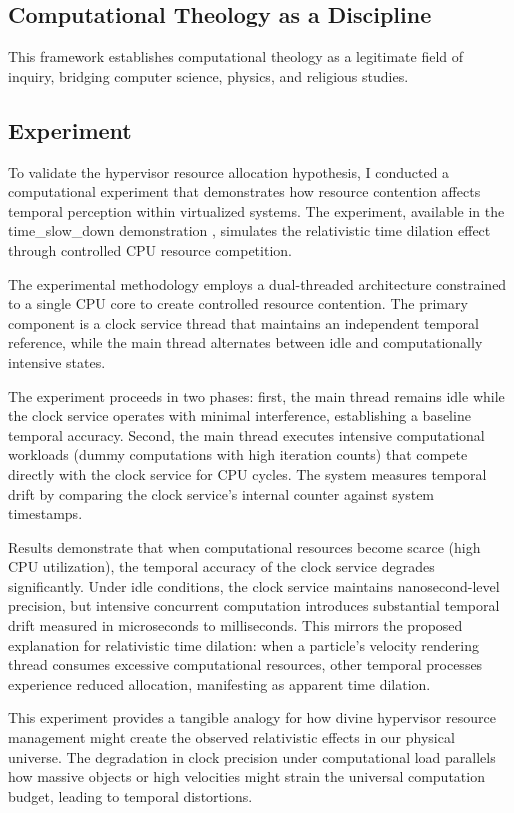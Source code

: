 \documentclass[12pt,a4paper]{article}
\begin{document}
\subsection{Computational Theology as a Discipline}

This framework establishes computational theology as a legitimate field of inquiry, bridging computer science, physics, and religious studies.

\subsection{Experiment}

To validate the hypervisor resource allocation hypothesis, I conducted a computational experiment that demonstrates how resource contention affects temporal perception within virtualized systems. The experiment, available in the time\_slow\_down demonstration \cite{time_slow_demo}, simulates the relativistic time dilation effect through controlled CPU resource competition.

The experimental methodology employs a dual-threaded architecture constrained to a single CPU core to create controlled resource contention. The primary component is a clock service thread that maintains an independent temporal reference, while the main thread alternates between idle and computationally intensive states.

The experiment proceeds in two phases: first, the main thread remains idle while the clock service operates with minimal interference, establishing a baseline temporal accuracy. Second, the main thread executes intensive computational workloads (dummy computations with high iteration counts) that compete directly with the clock service for CPU cycles. The system measures temporal drift by comparing the clock service's internal counter against system timestamps.

Results demonstrate that when computational resources become scarce (high CPU utilization), the temporal accuracy of the clock service degrades significantly. Under idle conditions, the clock service maintains nanosecond-level precision, but intensive concurrent computation introduces substantial temporal drift measured in microseconds to milliseconds. This mirrors the proposed explanation for relativistic time dilation: when a particle's velocity rendering thread consumes excessive computational resources, other temporal processes experience reduced allocation, manifesting as apparent time dilation.

This experiment provides a tangible analogy for how divine hypervisor resource management might create the observed relativistic effects in our physical universe. The degradation in clock precision under computational load parallels how massive objects or high velocities might strain the universal computation budget, leading to temporal distortions.
\end{document}
